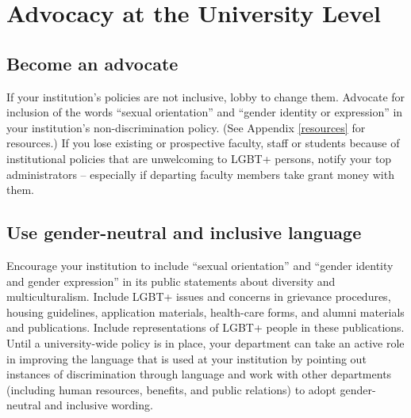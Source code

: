 %

\chapter{Advocacy at the University Level}	%
\label{univ-advocacy}		%
\normalsize			%


\section {Become an advocate}
\label{become-advocate}
If your institution's policies are not inclusive, lobby to change them.  Advocate for inclusion of the words ``sexual orientation'' and ``gender identity or expression'' in your institution's non-discrimination policy.  (See Appendix \ref{resources} for resources.)  If you lose existing or prospective faculty, staff or students because of institutional policies that are unwelcoming to LGBT+ persons, notify your top administrators -- especially if departing faculty members take grant money with them.


\section {Use gender-neutral and inclusive language}
\label{univ-language}
Encourage your institution to include ``sexual orientation'' and ``gender identity and gender expression'' in its public statements about diversity and multiculturalism.  Include LGBT+ issues and concerns in grievance procedures, housing guidelines, application materials, health-care forms, and alumni materials and publications.  Include representations of LGBT+ people in these publications.  Until a university-wide policy is in place, your department can take an active role in improving the language that is used at your institution by pointing out instances of discrimination through language and work with other departments (including human resources, benefits, and public relations) to adopt gender-neutral and inclusive wording.


